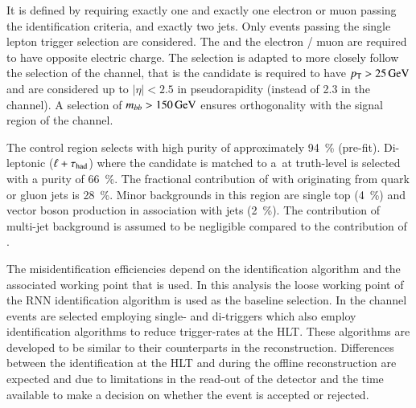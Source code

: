It is defined by requiring exactly one \tauhadvis and exactly one
electron or muon passing the identification criteria,
and exactly two \btagged jets. Only events passing the single lepton
trigger selection are considered. The \tauhadvis and the electron /
muon are required to have opposite electric charge. The \tauhadvis
selection is adapted to more closely follow the selection of the
\hadhad channel, that is the \tauhadvis candidate is required to have
$p_{\text{T}} > \SI{25}{\ensuremath{\text{GeV}}}$ and \tauhadvis are considered up to
$|\eta| < 2.5$ in pseudorapidity (instead of 2.3 in the \lephad
channel). A selection of $m_{bb} > \SI{150}{\ensuremath{\text{GeV}}}$ ensures orthogonality
with the signal region of the \lephad channel.


The control region selects \ttbar with high purity of approximately
\SI{94}{\percent} (pre-fit). Di-leptonic \ttbar ($\ell + \tau_{\text{had}}$)
where the \tauhadvis candidate is matched to a~\tauhad at truth-level
is selected with a purity of \SI{66}{\percent}. The fractional
contribution of \ttbar with \tauhadvis originating from quark or gluon
jets is \SI{28}{\percent}. Minor backgrounds in this region are single
top (\SI{4}{\percent}) and vector boson production in association with
jets (\SI{2}{\percent}). The contribution of multi-jet background is
assumed to be negligible compared to the contribution of
\ttbar{}.


The \tauhadvis misidentification efficiencies depend on the \tauhadvis
identification algorithm and the associated working point that is
used. In this analysis the loose working point of the RNN \tauhadvis
identification algorithm is used as the baseline \tauhadvis
selection. In the \hadhad channel events are selected employing
single- and di-\tauhadvis triggers which also employ identification
algorithms to reduce trigger-rates at the HLT. These algorithms are
developed to be similar to their counterparts in the \tauhadvis
reconstruction. Differences between the identification
at the HLT and during the offline reconstruction are expected and due
to limitations in the read-out of the detector and the time available
to make a decision on whether the event is accepted or rejected.

